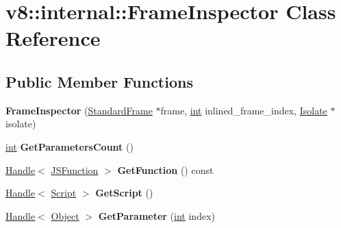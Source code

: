 \hypertarget{classv8_1_1internal_1_1FrameInspector}{}\section{v8\+:\+:internal\+:\+:Frame\+Inspector Class Reference}
\label{classv8_1_1internal_1_1FrameInspector}
\subsection*{Public Member Functions}
\begin{DoxyCompactItemize}
\item 
\mbox{\label{classv8_1_1internal_1_1FrameInspector_a99d19e603ef4dd46f991cd2edf168e73}} 
{\bfseries Frame\+Inspector} (\mbox{\hyperlink{classv8_1_1internal_1_1StandardFrame}{Standard\+Frame}} $\ast$frame, \mbox{\hyperlink{classint}{int}} inlined\+\_\+frame\+\_\+index, \mbox{\hyperlink{classv8_1_1internal_1_1Isolate}{Isolate}} $\ast$isolate)
\item 
\mbox{\label{classv8_1_1internal_1_1FrameInspector_ae868bb8c10b97fe67ac25db4931acdf1}} 
\mbox{\hyperlink{classint}{int}} {\bfseries Get\+Parameters\+Count} ()
\item 
\mbox{\label{classv8_1_1internal_1_1FrameInspector_a4ab833e867202b8901ec32d81c82e5a6}} 
\mbox{\hyperlink{classv8_1_1internal_1_1Handle}{Handle}}$<$ \mbox{\hyperlink{classv8_1_1internal_1_1JSFunction}{J\+S\+Function}} $>$ {\bfseries Get\+Function} () const
\item 
\mbox{\label{classv8_1_1internal_1_1FrameInspector_aa51f79c7405c8cdf3869b713a8761360}} 
\mbox{\hyperlink{classv8_1_1internal_1_1Handle}{Handle}}$<$ \mbox{\hyperlink{classv8_1_1internal_1_1Script}{Script}} $>$ {\bfseries Get\+Script} ()
\item 
\mbox{\label{classv8_1_1internal_1_1FrameInspector_a2c78de0af75bd24c129831a2b6d10772}} 
\mbox{\hyperlink{classv8_1_1internal_1_1Handle}{Handle}}$<$ \mbox{\hyperlink{classv8_1_1internal_1_1Object}{Object}} $>$ {\bfseries Get\+Parameter} (\mbox{\hyperlink{classint}{int}} index)

\end{DoxyCompactItemize}
